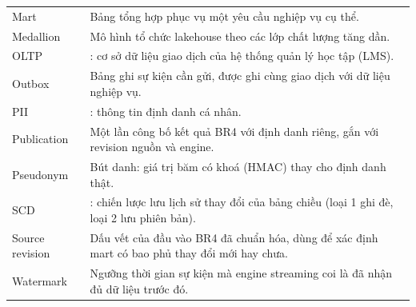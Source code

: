 {\begin{longtable}{@{}L{3.4cm}L{11.2cm}@{}}
Mart & Bảng tổng hợp phục vụ một yêu cầu nghiệp vụ cụ thể. \\
Medallion & Mô hình tổ chức lakehouse theo các lớp chất lượng tăng dần. \\
OLTP & : cơ sở dữ liệu giao dịch của hệ thống quản lý học tập (LMS). \\
Outbox & Bảng ghi sự kiện cần gửi, được ghi cùng giao dịch với dữ liệu nghiệp vụ. \\
PII & : thông tin định danh cá nhân. \\
Publication & Một lần công bố kết quả BR4 với định danh riêng, gắn với revision nguồn và engine. \\
Pseudonym & Bút danh: giá trị băm có khoá (HMAC) thay cho định danh thật. \\
SCD & : chiến lược lưu lịch sử thay đổi của bảng chiều (loại 1 ghi đè, loại 2 lưu phiên bản). \\
Source revision & Dấu vết của đầu vào BR4 đã chuẩn hóa, dùng để xác định mart có bao phủ thay đổi mới hay chưa. \\
Watermark & Ngưỡng thời gian sự kiện mà engine streaming coi là đã nhận đủ dữ liệu trước đó. \\
\bottomrule
\end{longtable}}
